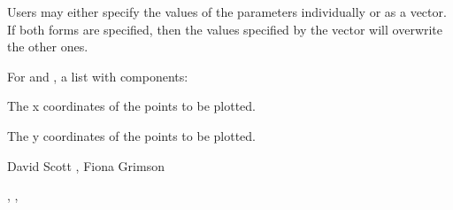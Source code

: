 \begin{Details}\relax
Users may either specify the values of the parameters individually or
as a vector. If both forms are specified, then the values specified by
the vector  will overwrite the other ones.
\end{Details}
\begin{Value}
For  and , a list with components:
\begin{ldescription}
\item[\code{x}] The x coordinates of the points to be plotted.
\item[\code{y}] The y coordinates of the points to be plotted.
\end{ldescription}
\end{Value}
\begin{Author}\relax
David Scott , Fiona Grimson
\end{Author}
\begin{SeeAlso}\relax
{}, , 
\end{SeeAlso}

